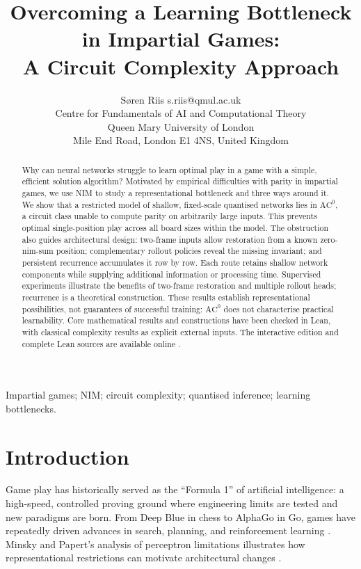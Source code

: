 \documentclass[twoside,11pt]{article}
\title{Overcoming a Learning Bottleneck in Impartial Games:\\
A Circuit Complexity Approach}
\author{\name S{\o}ren Riis \email s.riis@qmul.ac.uk \\
\addr Centre for Fundamentals of AI and Computational Theory\\
Queen Mary University of London\\
Mile End Road, London E1 4NS, United Kingdom}
\newcommand{\AC}{\mathrm{AC}}
\numberwithin{theorem}{section}
\numberwithin{equation}{section}
\begin{document}
\maketitle

\begin{abstract}
Why can neural networks struggle to learn optimal play in a game with a simple, efficient solution algorithm? Motivated by empirical difficulties with parity in impartial games, we use NIM to study a representational bottleneck and three ways around it. We show that a restricted model of shallow, fixed-scale quantised networks lies in $\AC^0$, a circuit class unable to compute parity on arbitrarily large inputs. This prevents optimal single-position play across all board sizes within the model.
The obstruction also guides architectural design: two-frame inputs allow restoration from a known zero-nim-sum position; complementary rollout policies reveal the missing invariant; and persistent recurrence accumulates it row by row. Each route retains shallow network components while supplying additional information or processing time. Supervised experiments illustrate the benefits of two-frame restoration and multiple rollout heads; recurrence is a theoretical construction. These results establish representational possibilities, not guarantees of successful training: $\AC^0$ does not characterise practical learnability.
Core mathematical results and constructions have been checked in Lean, with classical complexity results as explicit external inputs. The interactive edition and complete Lean sources are available online \citep{riis2026interactive,riis2026lean}.
\end{abstract}

\begin{keywords}
Impartial games; NIM; circuit complexity; quantised inference; learning bottlenecks.
\end{keywords}



\section{Introduction}
\label{sec:intro}

Game play has historically served as the ``Formula 1'' of artificial intelligence: a high-speed, controlled proving ground where engineering limits are tested and new paradigms are born.
From Deep Blue in chess to AlphaGo in Go, games have repeatedly driven advances in search, planning, and reinforcement learning \citep{silver2016alphago,silver2017alphagozero,silver2018alphazero,schrittwieser2020muzero}.
Minsky and Papert's analysis of perceptron limitations illustrates how representational restrictions can motivate architectural changes \citep{minsky1969perceptrons}.
\end{document}
